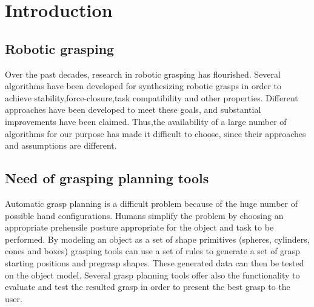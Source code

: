 \setcounter{secnumdepth}{5}
\usepackage{amsmath}
\usepackage{amssymb} %
\usepackage{algorithm}
\usepackage{algpseudocode}
\usepackage{bm}
\usepackage{subcaption} %
\usepackage{algpseudocode}
\usepackage{pifont}
\usepackage{graphicx} %
\usepackage{epstopdf} %
\usepackage{listings}
\usepackage{xcolor}
\usepackage{verbatim}
\usepackage{hyperref}
\usepackage{enumitem}
\usepackage{subfloat}
\usepackage{float}

\graphicspath{ {fig/} } %
\newcommand{\inr}[1]{\in \mathbb{R}^#1}

\usepackage{amsthm} %
\newtheorem{definition}{Definition}[section]
\newtheorem*{remark}{Remark}
\newpage


\pagestyle{empty} %
\titleGM %
\tableofcontents
\newpage

\chapter{Introduction}
\section{Robotic grasping}
Over the past decades, research in robotic grasping has flourished. Several algorithms have been developed for synthesizing robotic grasps in order to achieve stability,force-closure,task compatibility and other properties. Different approaches have been developed to meet these goals, and substantial improvements have been claimed. Thus,the availability of a large number of algorithms
for our purpose has made it difficult to choose, since their approaches and assumptions are different.
\section{Need of grasping planning tools}
\par
Automatic grasp planning is a difficult problem because of the huge number of possible hand configurations. Humans simplify the problem by choosing an appropriate prehensile posture appropriate for the object and task to be performed. By modeling an object as a set of shape primitives (spheres, cylinders, cones and boxes) grasping tools can use a set of rules to generate a set of grasp starting positions and pregrasp shapes. These generated data can then be tested on the object model. Several grasp planning tools offer also the functionality to evaluate and test the resulted grasp in order to present the best grasp to the user.
